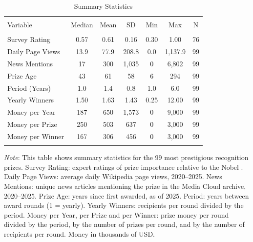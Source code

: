 
\begin{table}[!htbp] \centering 
  \caption{Summary Statistics} 
  \label{summaryStats} 
\begin{tabular}{lcccccc} 
\\[-1.8ex]\hline 
\hline \\[-1.8ex] 
Variable & Median & Mean & SD & Min & Max & N \\ 
\hline \\[-1.8ex] 
Survey Rating & 0.57 & 0.61 & 0.16 & 0.30 & 1.00 & 76 \\ 
Daily Page Views & 13.9 & 77.9 & 208.8 & 0.0 & 1{,}137.9 & 99 \\ 
News Mentions & 17 & 300 & 1{,}035 & 0 & 6{,}802 & 99 \\ 
Prize Age & 43 & 61 & 58 & 6 & 294 & 99 \\ 
Period (Years) & 1.0 & 1.4 & 0.8 & 1.0 & 6.0 & 99 \\ 
Yearly Winners & 1.50 & 1.63 & 1.43 & 0.25 & 12.00 & 99 \\ 
Money per Year & 187 & 650 & 1{,}573 & 0 & 9{,}000 & 99 \\ 
Money per Prize & 250 & 503 & 637 & 0 & 3{,}000 & 99 \\ 
Money per Winner & 167 & 306 & 456 & 0 & 3{,}000 & 99 \\ 
\hline \\[-1.8ex] 
\end{tabular} 
\noindent \justify \footnotesize \textit{Note}: This table shows summary statistics for the 99 most prestigious recognition prizes. Survey Rating: expert ratings of prize importance relative to the Nobel \cite{zheng2015mapping, jiang2018hierarchical}. Daily Page Views: average daily Wikipedia page views, 2020--2025. News Mentions: unique news articles mentioning the prize in the Media Cloud archive, 2020--2025. Prize Age: years since first awarded, as of 2025. Period: years between award rounds (1 = yearly). Yearly Winners: recipients per round divided by the period. Money per Year, per Prize and per Winner: prize money per round divided by the period, by the number of prizes per round, and by the number of recipients per round. Money in thousands of USD.
\end{table}
